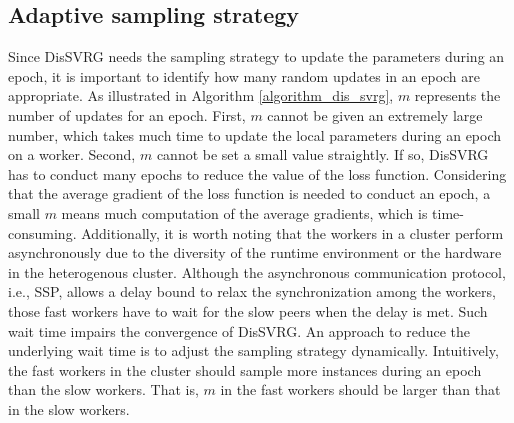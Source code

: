 \documentclass[preprint,review,11pt,a4paper]{elsarticle}
\begin{document}
\subsection{Adaptive sampling strategy}

Since DisSVRG needs the sampling strategy to update the parameters during an epoch, it is important to identify how many random updates in an epoch are appropriate.  As illustrated in Algorithm \ref{algorithm_dis_svrg}, $m$ represents the number of updates for an epoch. First, $m$ cannot be given an extremely large number, which takes much time to update the local parameters during an epoch on a worker.  Second, $m$ cannot be set a small value straightly. If so, DisSVRG has to conduct many epochs to reduce the value of the loss function. Considering that the average gradient of the loss function is needed to conduct an epoch, a small $m$ means much computation of the average gradients, which is time-consuming.
Additionally, it is worth noting that the workers in a cluster perform asynchronously due to the diversity of the runtime environment or the hardware in the heterogenous cluster.  Although the asynchronous communication protocol, i.e., SSP, allows a delay bound to relax the synchronization among the workers, those fast workers have to wait for the slow peers when the delay is met. Such wait time impairs the convergence of DisSVRG. An approach to reduce the underlying wait time is to adjust the sampling strategy dynamically.  Intuitively, the fast workers in the cluster should sample more instances during an epoch than the slow workers. That is, $m$ in the fast workers should be larger than that in the slow workers.
\end{document}
